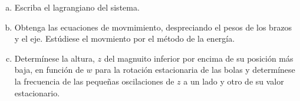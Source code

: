 \documentclass{article}
\begin{document}
\begin{enumerate}[a)]
    \item Escriba el lagrangiano del sistema.
    \item Obtenga las ecuaciones de movmimiento, despreciando el pesos de los brazos y el eje. Estúdiese el movmiento por el método de la energía.
    \item Determínese la altura, $z$ del magnuito inferior por encima de su posición más baja, en función de $w$ para la rotación estacionaria de las bolas 
    y determínese la frecuencia de las pequeñas oscilaciones de $z$ a un lado y otro de su valor estacionario.
\end{enumerate}
\begin{tcolorbox}[breakable]

\end{tcolorbox}
\end{document}
